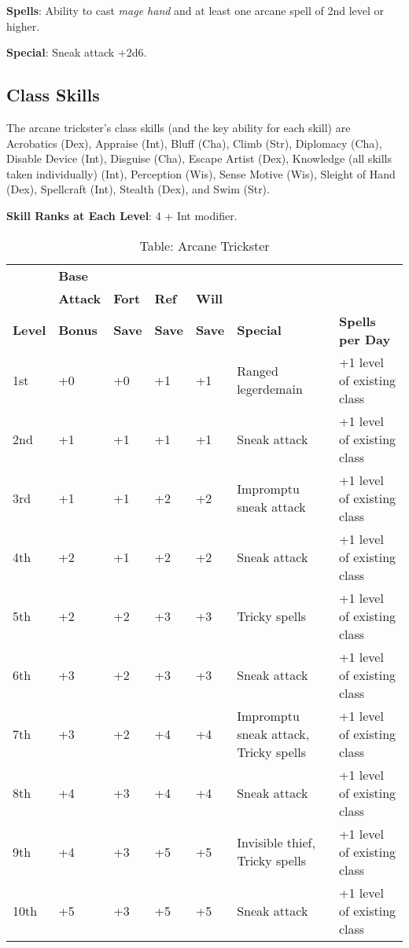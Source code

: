 \textbf{Spells}: Ability to cast \textit{mage hand }and at least one arcane spell of 2nd level or higher.
				
\textbf{Special}: Sneak attack +2d6.
				
\subsection{Class Skills}

				
The arcane trickster's class skills (and the key ability for each skill) are Acrobatics (Dex), Appraise (Int), Bluff (Cha), Climb (Str), Diplomacy (Cha), Disable Device (Int), Disguise (Cha), Escape Artist (Dex), Knowledge (all skills taken individually) (Int), Perception (Wis), Sense Motive (Wis), Sleight of Hand (Dex), Spellcraft (Int), Stealth (Dex), and Swim (Str).
				
\textbf{Skill Ranks at Each Level}: 4 + Int modifier.
	
\begin{table*}[]
\sffamily
\caption{Table: Arcane Trickster}
\begin{tabular}{lllllll}
      & \textbf{Base} & & & & & \\ 
      & \textbf{Attack} & \textbf{Fort} & \textbf{Ref} & \textbf{Will} & & \\
\textbf{Level} & \textbf{Bonus }& \textbf{Save }&\textbf{ Save }& \textbf{Save }& \textbf{Special }& \textbf{Spells per Day}\\
1st & +0 & +0 & +1 & +1 & Ranged legerdemain & +1 level of existing class\\
2nd & +1 & +1 & +1 & +1 & Sneak attack & +1 level of existing class\\
3rd & +1 & +1 & +2 & +2 & Impromptu sneak attack & +1 level of existing class\\
4th & +2 & +1 & +2 & +2 & Sneak attack & +1 level of existing class\\
5th & +2 & +2 & +3 & +3 & Tricky spells & +1 level of existing class\\
6th & +3 & +2 & +3 & +3 & Sneak attack & +1 level of existing class\\
7th & +3 & +2 & +4 & +4 & Impromptu sneak attack, Tricky spells & +1 level of existing class\\
8th & +4 & +3 & +4 & +4 & Sneak attack & +1 level of existing class\\
9th & +4 & +3 & +5 & +5 & Invisible thief, Tricky spells & +1 level of existing class\\
10th & +5 & +3 & +5 & +5 & Sneak attack & +1 level of existing class\\
\end{tabular}
\end{table*}
			
